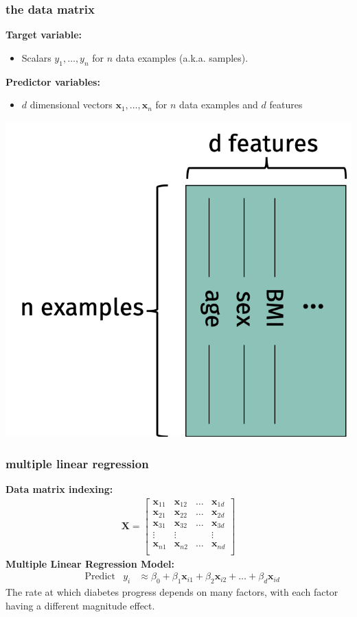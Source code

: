 \documentclass[handout,compress]{beamer}
\newcommand{\bv}[1]{\mathbf{#1}}
\begin{document}
\begin{frame}
	\frametitle{the data matrix}
	\textbf{Target variable:}
	\begin{itemize}
		\item Scalars $y_1, \ldots, y_n$ for $n$ data examples (a.k.a. samples).
	\end{itemize}
	\textbf{Predictor variables:}
	\begin{itemize}
		\item $d$ dimensional vectors $\bv{x}_1, \ldots, \bv{x}_n$ for $n$ data examples and $d$ features
	\end{itemize}
\vspace{-1.5em}

	\begin{center}
		\includegraphics[width=.45\textwidth]{data_matrix_features.png}
	\end{center}
\end{frame}

\begin{frame}
	\frametitle{multiple linear regression}
	\textbf{Data matrix indexing:}
	\begin{align*}
	\bv{X} = \begin{bmatrix}
	\bv{x}_{11} & \bv{x}_{12}  & \ldots &\bv{x}_{1d}\\
	\bv{x}_{21} & \bv{x}_{22}  & \ldots &\bv{x}_{2d}\\
	\bv{x}_{31} & \bv{x}_{32}  & \ldots &\bv{x}_{3d}\\
	\vdots & \vdots  &  &\vdots\\
	\bv{x}_{n1} & \bv{x}_{n2}  & \ldots &\bv{x}_{nd}\\ 
	\end{bmatrix}
	\end{align*}
	\textbf{Multiple Linear Regression Model:}
	\begin{align*}
	&\text{Predict} & y_i &\approx \beta_0 + \beta_1 \bv{x}_{i1} + \beta_2 \bv{x}_{i2} + \ldots + \beta_d \bv{x}_{id}
	\end{align*}
	The rate at which diabetes progress depends on many factors, with each factor having a different magnitude effect.
\end{frame}
\end{document}
